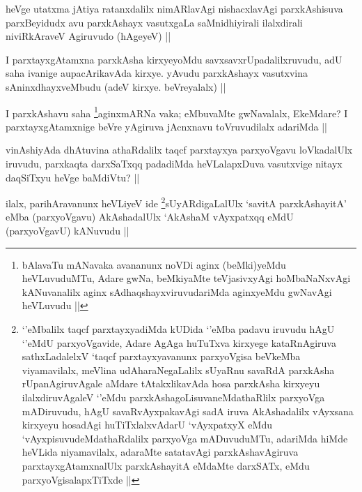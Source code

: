 
\begin{artha}
heVge utatxma jAtiya ratanxdalilx nimARlavAgi nishacxlavAgi parxkAshisuva parxBeyidudx avu parxkAshayx vasutxgaLa saMnidhiyirali ilalxdirali niviRkAraveV Agiruvudo (hAgeyeV) ||
\end{artha}

\begin{artha}
I parxtayxgAtamxna parxkAsha kirxyeyoMdu savxsavxrUpadalilxruvudu, adU saha ivanige aupacArikavAda kirxye. yAvudu parxkAshayx vasutxvina sAninxdhayxveMbudu (adeV kirxye. beVreyalalx) ||
\end{artha}

\begin{artha}
I parxkAshavu saha \footnote{bAlavaTu mANavaka avananunx noVDi aginx (beMki)yeMdu heVLuvuduMTu, Adare gwNa, beMkiyaMte teVjasivxyAgi hoMbaNaNxvAgi kANuvanalilx aginx sAdhaqshayxviruvudariMda aginxyeMdu gwNavAgi heVLuvudu ||}aginxmARNa vaka; eMbuvaMte gwNavalalx, EkeMdare? I parxtayxgAtamxnige beVre yAgiruva jAcnxnavu toVruvudilalx adariMda ||
\end{artha}


\begin{artha}
vinAshiyAda dhAtuvina athaRdalilx taqcf parxtayxya parxyoVgavu loVkadalUlx iruvudu, parxkaqta darxSaTxqq padadiMda heVLalapxDuva vasutxvige nitayx daqSiTxyu heVge baMdiVtu? ||
\end{artha}


\begin{artha}
ilalx, parihAravanunx heVLiyeV ide \footnote{`\stext'eMbalilx taqcf parxtayxyadiMda kUDida `\stext'eMba padavu iruvudu hAgU `\stext'eMdU parxyoVgavide, Adare AgAga huTuTxva kirxyege kataRnAgiruva sathxLadalelxV `taqcf parxtayxyavanunx parxyoVgisa beVkeMba viyamavilalx, meVlina udAharaNegaLalilx sUyaRnu savaRdA parxkAsha rUpanAgiruvAgale aMdare tAtakxlikavAda hosa parxkAsha kirxyeyu ilalxdiruvAgaleV `\stext'eMdu parxkAshagoLisuvaneMdathaRlilx parxyoVga mADiruvudu, hAgU savaRvAyxpakavAgi sadA iruva AkAshadalilx vAyxsana kirxyeyu hosadAgi huTiTxlalxvAdarU `vAyxpatxyX eMdu `vAyxpisuvudeMdathaRdalilx parxyoVga mADuvuduMTu, adariMda hiMde heVLida niyamavilalx, adaraMte satatavAgi parxkAshavAgiruva parxtayxgAtamxnalUlx parxkAshayitA eMdaMte darxSATx, eMdu parxyoVgisalapxTiTxde ||}sUyARdigaLalUlx `savitA parxkAshayitA' eMba (parxyoVgavu) AkAshadalUlx `AkAshaM vAyxpatxqq eMdU (parxyoVgavU) kANuvudu ||
\end{artha}

